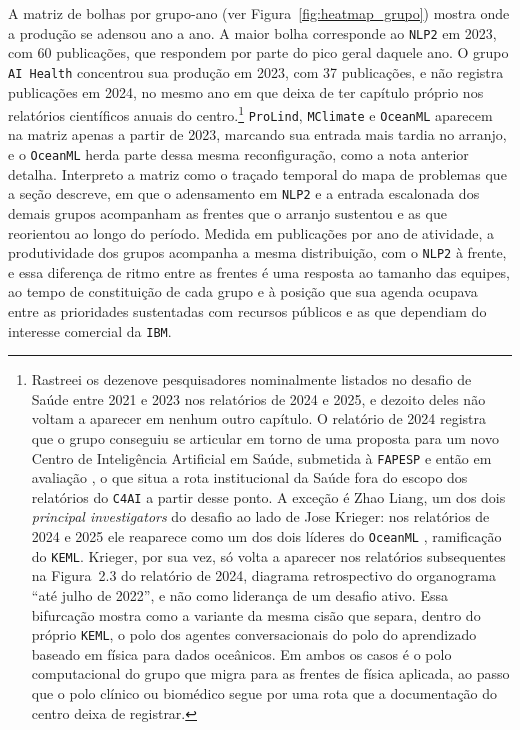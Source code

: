 A matriz de bolhas por grupo-ano (ver Figura~\ref{fig:heatmap_grupo}) mostra onde a produção se adensou ano a ano. A maior bolha corresponde ao \texttt{NLP2} em 2023, com 60 publicações, que respondem por parte do pico geral daquele ano. O grupo \texttt{AI Health} concentrou sua produção em 2023, com 37 publicações, e não registra publicações em 2024, no mesmo ano em que deixa de ter capítulo próprio nos relatórios científicos anuais do centro.\footnote{Rastreei os dezenove pesquisadores nominalmente listados no desafio de Saúde entre 2021 e 2023 nos relatórios de 2024 e 2025, e dezoito deles não voltam a aparecer em nenhum outro capítulo. O relatório de 2024 registra que o grupo conseguiu se articular em torno de uma proposta para um novo Centro de Inteligência Artificial em Saúde, submetida à \texttt{FAPESP} e então em avaliação \parencite{C4AI2024}, o que situa a rota institucional da Saúde fora do escopo dos relatórios do \texttt{C4AI} a partir desse ponto. A exceção é Zhao Liang, um dos dois \textit{principal investigators} do desafio ao lado de Jose Krieger: nos relatórios de 2024 e 2025 ele reaparece como um dos dois líderes do \texttt{OceanML} \parencite{C4AI2024}, ramificação do \texttt{KEML}. Krieger, por sua vez, só volta a aparecer nos relatórios subsequentes na Figura~2.3 do relatório de 2024, diagrama retrospectivo do organograma \enquote{até julho de 2022}, e não como liderança de um desafio ativo. Essa bifurcação mostra como a variante da mesma cisão que separa, dentro do próprio \texttt{KEML}, o polo dos agentes conversacionais do polo do aprendizado baseado em física para dados oceânicos. Em ambos os casos é o polo computacional do grupo que migra para as frentes de física aplicada, ao passo que o polo clínico ou biomédico segue por uma rota que a documentação do centro deixa de registrar.} \texttt{ProLind}, \texttt{MClimate} e \texttt{OceanML} aparecem na matriz apenas a partir de 2023, marcando sua entrada mais tardia no arranjo, e o \texttt{OceanML} herda parte dessa mesma reconfiguração, como a nota anterior detalha. Interpreto a matriz como o traçado temporal do mapa de problemas que a seção descreve, em que o adensamento em \texttt{NLP2} e a entrada escalonada dos demais grupos acompanham as frentes que o arranjo sustentou e as que reorientou ao longo do período. Medida em publicações por ano de atividade, a produtividade dos grupos acompanha a mesma distribuição, com o \texttt{NLP2} à frente, e essa diferença de ritmo entre as frentes é uma resposta ao tamanho das equipes, ao tempo de constituição de cada grupo e à posição que sua agenda ocupava entre as prioridades sustentadas com recursos públicos e as que dependiam do interesse comercial da \texttt{IBM}. 

